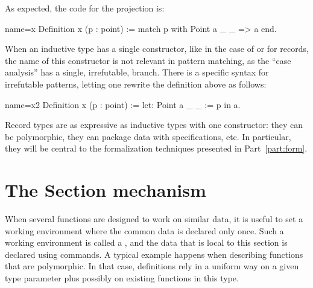 
As expected, the code for the  projection is:

\begin{coq}{name=x}{}
Definition x (p : point) := match p with Point a _ _ => a end.
\end{coq}

When an inductive type has a single constructor, like in the case of
 or for records, the name of this constructor is not relevant
in pattern matching, as the ``case analysis'' has a single, irrefutable,
branch. There is a specific syntax for irrefutable patterns, letting
one rewrite the definition above as follows:

\begin{coq}{name=x2}{}
Definition x (p : point) := let: Point a _ _ := p in a.
\end{coq}

Record types are as expressive as inductive types with one
constructor: they can be polymorphic, they can package data with
specifications, etc. In particular, they will be central to the
formalization techniques presented in Part~\ref{part:form}.


\section{The Section mechanism}\label{sec:section}
When several functions are designed to work on similar data, it is
useful to set a working environment where the common data is declared
only once.  Such a working environment is called a , and
the data that is local to this section is declared using 
commands.  A typical example happens when describing functions that
are polymorphic. In that case, definitions rely in a uniform way on a
given type parameter plus possibly on existing functions in this type.


